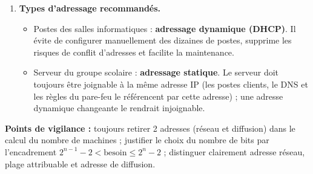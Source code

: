 \documentclass[11pt]{article}
\newcommand{\cle}[1]{{\popxbold\color{popdark}#1}}
\begin{document}
\begin{corrige}
\begin{enumerate}
\begin{itemize}
\item adresse de diffusion : \texttt{172.20.0.63}.
\end{itemize}
\item \textbf{Types d'adressage recommandés.}
\begin{itemize}
\item Postes des salles informatiques : \textbf{adressage dynamique (\cle{DHCP})}. Il évite de configurer manuellement des dizaines de postes, supprime les risques de conflit d'adresses et facilite la maintenance.
\item Serveur du groupe scolaire : \textbf{adressage statique}. Le serveur doit toujours être joignable à la même adresse IP (les postes clients, le \cle{DNS} et les règles du pare-feu le référencent par cette adresse) ; une adresse dynamique changeante le rendrait injoignable.
\end{itemize}
\end{enumerate}
\textbf{Points de vigilance :} toujours retirer 2 adresses (réseau et diffusion) dans le calcul du nombre de machines ; justifier le choix du nombre de bits par l'encadrement $2^{n-1} - 2 < \text{besoin} \leq 2^n - 2$ ; distinguer clairement adresse réseau, plage attribuable et adresse de diffusion.
\end{corrige}
\end{document}

